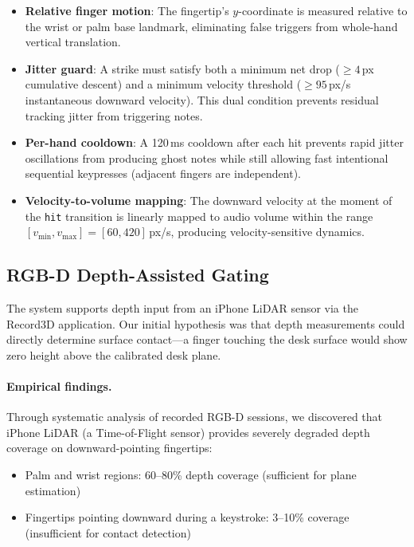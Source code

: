\documentclass[11pt,a4paper]{article}
\begin{document}
\begin{itemize}[nosep]
    \item \textbf{Relative finger motion}: The fingertip's $y$-coordinate is measured relative to the wrist or palm base landmark, eliminating false triggers from whole-hand vertical translation.
    \item \textbf{Jitter guard}: A strike must satisfy both a minimum net drop ($\geq 4$\,px cumulative descent) and a minimum velocity threshold ($\geq 95$\,px/s instantaneous downward velocity). This dual condition prevents residual tracking jitter from triggering notes.
    \item \textbf{Per-hand cooldown}: A 120\,ms cooldown after each hit prevents rapid jitter oscillations from producing ghost notes while still allowing fast intentional sequential keypresses (adjacent fingers are independent).
    \item \textbf{Velocity-to-volume mapping}: The downward velocity at the moment of the \texttt{hit} transition is linearly mapped to audio volume within the range $[v_\text{min}, v_\text{max}] = [60, 420]$\,px/s, producing velocity-sensitive dynamics.
\end{itemize}

\subsection{RGB-D Depth-Assisted Gating}

The system supports depth input from an iPhone LiDAR sensor via the Record3D application.
Our initial hypothesis was that depth measurements could directly determine surface contact---a finger touching the desk surface would show zero height above the calibrated desk plane.

\paragraph{Empirical findings.}
Through systematic analysis of recorded RGB-D sessions, we discovered that iPhone LiDAR (a Time-of-Flight sensor) provides severely degraded depth coverage on downward-pointing fingertips:

\begin{itemize}[nosep]
    \item Palm and wrist regions: 60--80\% depth coverage (sufficient for plane estimation)
    \item Fingertips pointing downward during a keystroke: 3--10\% coverage (insufficient for contact detection)
\end{itemize}
\end{document}
